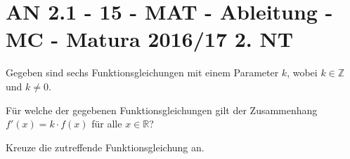 \section{AN 2.1 - 15 - MAT - Ableitung - MC - Matura 2016/17 2. NT}

\begin{beispiel}{1} %
Gegeben sind sechs Funktionsgleichungen mit einem Parameter $k$, wobei $k \in \mathbb Z$ und $k \neq 0$. \leer

Für welche der gegebenen Funktionsgleichungen gilt der Zusammenhang $f'(x)=k\cdot f(x)$ für alle $x \in \mathbb R$?

Kreuze die zutreffende Funktionsgleichung an.

\end{beispiel}